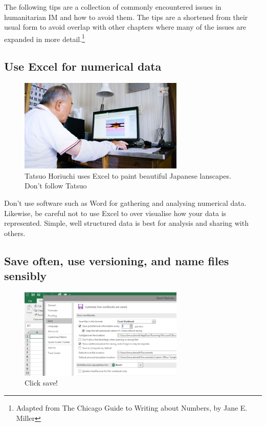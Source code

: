 \documentclass[
  a4paper,
  onecolumn,
  oneside]{book}
\begin{document}
The following tips are a collection of commonly encountered issues in
humanitarian IM and how to avoid them. The tips are a shortened from
their usual form to avoid overlap with other chapters where many of the
issues are expanded in more detail.\footnote{Adapted from The Chicago
  Guide to Writing about Numbers, by Jane E. Miller}

\hypertarget{use-excel-for-numerical-data}{%
\subsection{Use Excel for numerical
data}\label{use-excel-for-numerical-data}}

\begin{figure}

{\centering \includegraphics[width=0.7\textwidth,height=\textheight]{part1/./images/paintingwithexcel.jpg}

}

\caption{Tatsuo Horiuchi uses Excel to paint beautiful Japanese
lanscapes. Don't follow Tatsuo}

\end{figure}

Don't use software such as Word for gathering and analysing numerical
data. Likewise, be careful not to use Excel to over visualise how your
data is represented. Simple, well structured data is best for analysis
and sharing with others.

\hypertarget{save-often-use-versioning-and-name-files-sensibly}{%
\subsection{Save often, use versioning, and name files
sensibly}\label{save-often-use-versioning-and-name-files-sensibly}}

\begin{figure}

{\centering \includegraphics[width=0.7\textwidth,height=\textheight]{part1/./images/saveoften.png}

}

\caption{Click save!}

\end{figure}
\end{document}
